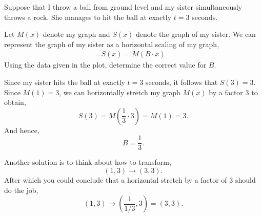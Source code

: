 \documentclass[12pt]{article} %
\begin{document}
\begin{qstn}
Suppose that I throw a ball from ground level and my sister simultaneously throws a rock. She manages to hit the
ball at exactly $t=  3$ seconds.
      \begin{center}
      \end{center}
\end{qstn}
Let $M(x)$ denote my graph and $S(x)$ denote the graph of my sister. We can represent the graph of my sister as
a horizontal scaling of my graph, 
\begin{align*}
  S(x) = M(B\cdot x) \tag{$B \in \R, B \neq 1$}
\end{align*}
 Using the data given in the plot, determine the correct value for $B$.
 \begin{solution}[\textbf{1}]
   Since my sister hits the ball at exactly $t = 3$ seconds, it follows that $S(3) = 3$. Since $M(1) = 3$, we can
   horizontally stretch my graph $M(x)$ by a factor  $3$ to obtain,
   \[
      S(3) = M\left( \frac{1}{3}\cdot 3 \right) = M(1) = 3
   .\] And hence,
   \[
        B = \frac{1}{3}
   .\] 
 \end{solution}

 \begin{solution}[\textbf{2}]
   Another solution is to think about how to transform,
   \[
      (1,3) \longrightarrow (3,3)
   .\] After which you could conclude that a horizontal stretch by a factor of $3$ should do the job,
   \[
      (1,3) \longrightarrow \left(\frac{1}{1 / 3}, 3 \right) = (3,3) 
   .\] 
 \end{solution}
\end{document}
